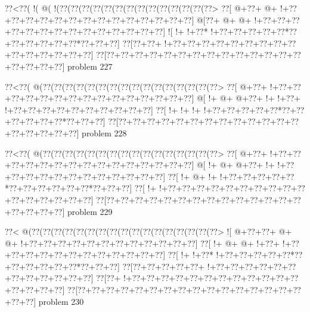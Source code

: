 \vbox{\vbox{\goo
\0??<\0??(\- !(\- @(\- !(\0??(\0??(\0??(\0??(\0??(\0??(\0??(\0??(\0??(\0??(\0??(\0??(\0??(\0??>
\0??[\- @+\0??+\- @+\- !+\0??+\0??+\0??+\0??+\0??+\0??+\0??+\0??+\0??+\0??+\0??+\0??+\0??+\0??]
\- @[\0??+\- @+\- @+\- !+\0??+\0??+\0??+\0??+\0??+\0??+\0??+\0??+\0??+\0??+\0??+\0??+\0??+\0??]
\- ![\- !+\- !+\0??*\- !+\0??+\0??+\0??+\0??+\0??*\0??+\0??+\0??+\0??+\0??+\0??*\0??+\0??+\0??]
\0??[\0??+\0??+\- !+\0??+\0??+\0??+\0??+\0??+\0??+\0??+\0??+\0??+\0??+\0??+\0??+\0??+\0??+\0??]
\0??[\0??+\0??+\0??+\0??+\0??+\0??+\0??+\0??+\0??+\0??+\0??+\0??+\0??+\0??+\0??+\0??+\0??+\0??]
}
\hfil problem 227\hfil\break
}



\vbox{\vbox{\goo
\0??<\0??(\- @(\0??(\0??(\0??(\0??(\0??(\0??(\0??(\0??(\0??(\0??(\0??(\0??(\0??(\0??(\0??(\0??>
\0??[\- @+\0??+\- !+\0??+\0??+\0??+\0??+\0??+\0??+\0??+\0??+\0??+\0??+\0??+\0??+\0??+\0??+\0??]
\- @[\- !+\- @+\- @+\0??+\- !+\- !+\0??+\- !+\0??+\0??+\0??+\0??+\0??+\0??+\0??+\0??+\0??+\0??]
\0??[\- !+\- !+\- !+\- !+\0??+\0??+\0??+\0??+\0??*\0??+\0??+\0??+\0??+\0??+\0??*\0??+\0??+\0??]
\0??[\0??+\0??+\0??+\0??+\0??+\0??+\0??+\0??+\0??+\0??+\0??+\0??+\0??+\0??+\0??+\0??+\0??+\0??]
}
\hfil problem 228\hfil\break
}



\vbox{\vbox{\goo
\0??<\0??(\- @(\0??(\0??(\0??(\0??(\0??(\0??(\0??(\0??(\0??(\0??(\0??(\0??(\0??(\0??(\0??(\0??>
\0??[\- @+\0??+\- !+\0??+\0??+\0??+\0??+\0??+\0??+\0??+\0??+\0??+\0??+\0??+\0??+\0??+\0??+\0??]
\- @[\- !+\- @+\- @+\0??+\- !+\- !+\0??+\0??+\0??+\0??+\0??+\0??+\0??+\0??+\0??+\0??+\0??+\0??]
\0??[\- !+\- @+\- !+\- !+\0??+\0??+\0??+\0??+\0??*\0??+\0??+\0??+\0??+\0??+\0??*\0??+\0??+\0??]
\0??[\- !+\- !+\0??+\0??+\0??+\0??+\0??+\0??+\0??+\0??+\0??+\0??+\0??+\0??+\0??+\0??+\0??+\0??]
\0??[\0??+\0??+\0??+\0??+\0??+\0??+\0??+\0??+\0??+\0??+\0??+\0??+\0??+\0??+\0??+\0??+\0??+\0??]
}
\hfil problem 229\hfil\break
}



\vbox{\vbox{\goo
\0??<\- @(\0??(\0??(\0??(\0??(\0??(\0??(\0??(\0??(\0??(\0??(\0??(\0??(\0??(\0??(\0??(\0??(\0??>
\- ![\- @+\0??+\0??+\- @+\- @+\- !+\0??+\0??+\0??+\0??+\0??+\0??+\0??+\0??+\0??+\0??+\0??+\0??]
\0??[\- !+\- @+\- @+\- !+\0??+\- !+\0??+\0??+\0??+\0??+\0??+\0??+\0??+\0??+\0??+\0??+\0??+\0??]
\0??[\- !+\- !+\0??*\- !+\0??+\0??+\0??+\0??+\0??*\0??+\0??+\0??+\0??+\0??+\0??*\0??+\0??+\0??]
\0??[\0??+\0??+\0??+\0??+\0??+\- !+\0??+\0??+\0??+\0??+\0??+\0??+\0??+\0??+\0??+\0??+\0??+\0??]
\0??[\0??+\- !+\0??+\0??+\0??+\0??+\0??+\0??+\0??+\0??+\0??+\0??+\0??+\0??+\0??+\0??+\0??+\0??]
\0??[\0??+\0??+\0??+\0??+\0??+\0??+\0??+\0??+\0??+\0??+\0??+\0??+\0??+\0??+\0??+\0??+\0??+\0??]
}
\hfil problem 230\hfil\break
}



